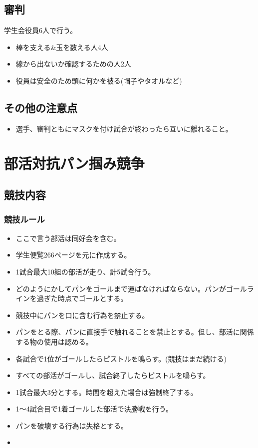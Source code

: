 \documentclass[titlepage]{jarticle}
\begin{document}
  \subsection{審判}
    学生会役員6人で行う。
   \begin{itemize}

    \item 棒を支える\&玉を数える人4人
    \item 線から出ないか確認するための人2人
    \item 役員は安全のため頭に何かを被る(帽子やタオルなど)
   \end{itemize}
  \subsection{その他の注意点}
   \begin{itemize}
    \item 選手、審判ともにマスクを付け試合が終わったら互いに離れること。
   \end{itemize}
\clearpage
 \section{部活対抗パン掴み競争}
  \subsection{競技内容}
   \subsubsection{競技ルール}
    \begin{itemize}
     \item ここで言う部活は同好会を含む。
     \item 学生便覧266ページを元に作成する。
     \item 1試合最大10組の部活が走り、計5試合行う。
     \item どのようにかしてパンをゴールまで運ばなければならない。パンがゴールラインを過ぎた時点でゴールとする。
     \item 競技中にパンを口に含む行為を禁止する。
     \item パンをとる際、パンに直接手で触れることを禁止とする。但し、部活に関係する物の使用は認める。
     \item 各試合で1位がゴールしたらピストルを鳴らす。(競技はまだ続ける)
     \item すべての部活がゴールし、試合終了したらピストルを鳴らす。
     \item 1試合最大3分とする。時間を超えた場合は強制終了する。
     \item 1～4試合目で1着ゴールした部活で決勝戦を行う。
     \item パンを破壊する行為は失格とする。
     \item 
    \end{itemize}
\end{document}
